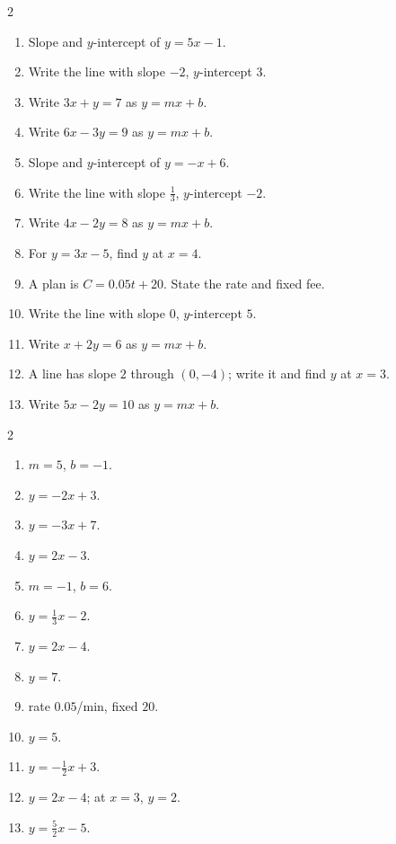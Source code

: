 \documentclass[11pt]{article}
\begin{document}
\begin{recapbox}
\begin{multicols}{2}
\small
\begin{enumerate}[leftmargin=*,itemsep=3pt]
  \item Slope and $y$-intercept of $y=5x-1$.
  \item Write the line with slope $-2$, $y$-intercept $3$.
  \item Write $3x+y=7$ as $y=mx+b$.
  \item Write $6x-3y=9$ as $y=mx+b$.
  \item Slope and $y$-intercept of $y=-x+6$.
  \item Write the line with slope $\tfrac13$, $y$-intercept $-2$.
  \item Write $4x-2y=8$ as $y=mx+b$.
  \item For $y=3x-5$, find $y$ at $x=4$.
  \item A plan is $C=0.05t+20$. State the rate and fixed fee.
  \item Write the line with slope $0$, $y$-intercept $5$.
  \item Write $x+2y=6$ as $y=mx+b$.
  \item A line has slope $2$ through $(0,-4)$; write it and find $y$ at $x=3$.
  \item Write $5x-2y=10$ as $y=mx+b$.
\end{enumerate}
\end{multicols}
\end{recapbox}

\begin{keybox}
\begin{multicols}{2}
\small
\begin{enumerate}[leftmargin=*,itemsep=3pt]
  \item $m=5$, $b=-1$.
  \item $y=-2x+3$.
  \item $y=-3x+7$.
  \item $y=2x-3$.
  \item $m=-1$, $b=6$.
  \item $y=\tfrac13x-2$.
  \item $y=2x-4$.
  \item $y=7$.
  \item rate $0.05$/min, fixed $20$.
  \item $y=5$.
  \item $y=-\tfrac12x+3$.
  \item $y=2x-4$; at $x=3$, $y=2$.
  \item $y=\tfrac52x-5$.
\end{enumerate}
\end{multicols}
\end{keybox}
\end{document}
